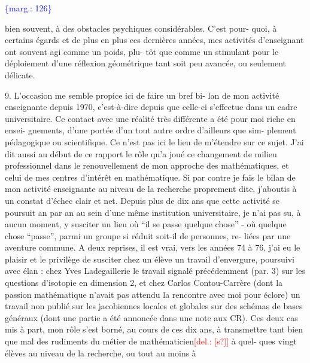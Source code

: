 \documentclass[11pt]{article}
\newcommand{\scanpage}[1]{\par\bigskip\noindent{\small\sffamily[scan #1]}\par}
\newcommand{\mspage}[1]{{\small\sffamily[p.\,#1]}}
\newcommand{\margin}[1]{\textcolor{blue}{\{\textsf{marg.:} #1\}}}
\newcommand{\deleted}[1]{\textcolor{red}{[\textsf{del.:} #1]}}
\newcommand{\unsure}[1]{[#1?]}
\begin{document}
\margin{126}

\clearpage
\scanpage{119/127}
\mspage{49}

bien souvent, à des obstacles psychiques considérables. C'est pour-%
quoi, à certains égards et de plus en plus ces dernières années,
mes activités d'enseignant ont souvent agi comme un poids, plu-%
tôt que comme un stimulant pour le déploiement d'une réflexion
géométrique tant soit peu avancée, ou seulement délicate.

9. L'occasion me semble propice ici de faire un bref bi-%
lan de mon activité enseignante depuis 1970, c'est-à-dire depuis
que celle-ci s'effectue dans un cadre universitaire. Ce contact
avec une réalité très différente a été pour moi riche en ensei-%
gnements, d'une portée d'un tout autre ordre d'ailleurs que sim-%
plement pédagogique ou scientifique. Ce n'est pas ici le lieu de
m'étendre sur ce sujet. J'ai dit aussi au début de ce rapport le
rôle qu'a joué ce changement de milieu professionnel dans le
renouvellement de mon approche des mathématiques, et celui de mes
centres d'intérêt en mathématique. Si par contre je fais le bilan
de mon activité enseignante au niveau de la recherche proprement
dite, j'aboutis à un constat d'échec clair et net. Depuis plus
de dix ans que cette activité se poursuit an par an au sein d'une
même institution universitaire, je n'ai pas su, à aucun moment,
y susciter un lieu où ``il se passe quelque chose'' - où quelque
chose ``passe'', parmi un groupe si réduit soit-il de personnes, re-%
liées par une aventure commune. A deux reprises, il est vrai, vers
les années 74 à 76, j'ai eu le plaisir et le privilège de susciter
chez un élève un travail d'envergure, poursuivi avec élan : chez
Yves Ladegaillerie le travail signalé précédemment (par. 3) sur
les questions d'isotopie en dimension 2, et chez Carlos Contou-Carrère
(dont la passion mathématique n'avait pas attendu la rencontre
avec moi pour éclore) un travail non publié sur les jacobiennes
locales et globales sur des schémas de bases généraux (dont une
partie a été annoncée dans une note aux CR). Ces deux cas mis à
part, mon rôle s'est borné, au cours de ces dix ans, à transmettre
tant bien que mal des rudiments du métier de mathématicien\deleted{\unsure{s}} à quel-%
ques vingt élèves au niveau de la recherche, ou tout au moins à
\end{document}
